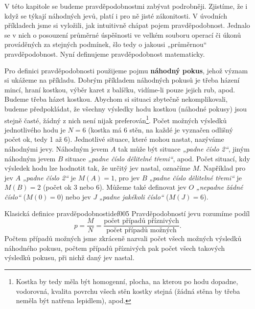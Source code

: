     V této kapitole se budeme pravděpodobnostmi zabývat podrobněji. Zjistíme, že i když se týkají 
    náhodných jevů, platí i pro ně jisté zákonitosti. V úvodních příkladech jsme si vyložili, jak 
    intuitivně chápat pojem pravděpodobnost. Jednalo se v nich o posouzení průměrné úspěšnosti ve 
    velkém souboru operací či úkonů prováděných za stejných podmínek, šlo tedy o jakousi 
    „průměrnou“ pravděpodobnost. Nyní definujeme pravděpodobnost matematicky.
    
      Pro definici pravděpodobnosti použijeme pojmu \textbf{náhodný pokus}, jehož význam si ukážeme 
      na příkladu. Dobrým příkladem náhodných pokusů je třeba házení mincí, hraní kostkou, výběr 
      karet z balíčku, vidíme-li pouze jejich rub, apod. Budeme třeba házet kostkou. Abychom si 
      situaci zbytečně nekomplikovali, budeme předpokládat, že všechny výsledky hodu kostkou 
      (náhodné pokusy) jsou stejně časté, žádný z nich není nijak preferován\footnote{Kostka by 
      tedy měla být homogenní, plocha, na kterou po hodu dopadne, vodorovná, kvalita povrchu všech 
      stěn kostky stejná (žádná stěna by třeba neměla být natřena lepidlem), apod.}. Počet možných 
      výsledků jednotlivého hodu je \(N = 6\) (kostka má \num{6} stěn, na každé je vyznačen odlišný 
      počet ok, tedy \num{1} až \num{6}). Jednotlivé situace, které mohou nastat, nazýváme 
      náhodnými jevy. Náhodným jevem \(A\) tak může být situace \emph{„padne číslo \num{2}“}, jiným 
      náhodným jevem \(B\) situace \emph{„padne číslo dělitelné třemi“}, apod. Počet situací, kdy 
      výsledek hodu lze hodnotit tak, že určitý jev nastal, označíme \(M\). Například pro jev \(A\) 
      \emph{„padne číslo \num{2}“} je \(M(A)= 1\), pro jev \(B\) \emph{„padne číslo dělitelné 
      třemi“} je \(M(B) = 2\) (počet ok \num{3} nebo \num{6}). Můžeme také definovat jev \(O\) 
      \emph{„nepadne žádné číslo“} (\(M(0) = 0\)) nebo jev \(J\) \emph{„padne jakékoli číslo“} 
      (\(M(J) = 6\)).      
      \begin{mathdef}{Klasická definice pravděpodobnosti}{def005}
        Pravděpodobností jevu rozumíme podíl
        \begin{equation}\label{mai:eq011}
          p = \frac{M}{N} = \frac{\text{počet případů příznivých}}{\text{počet případů možných}}.
        \end{equation}  
        Počtem případů možných jsme zkráceně nazvali počet všech možných výsledků náhodného 
        pokusu, počtem případů příznivých pak počet všech takových výsledků pokusu, při nichž daný 
        jev nastal.
      \end{mathdef}

